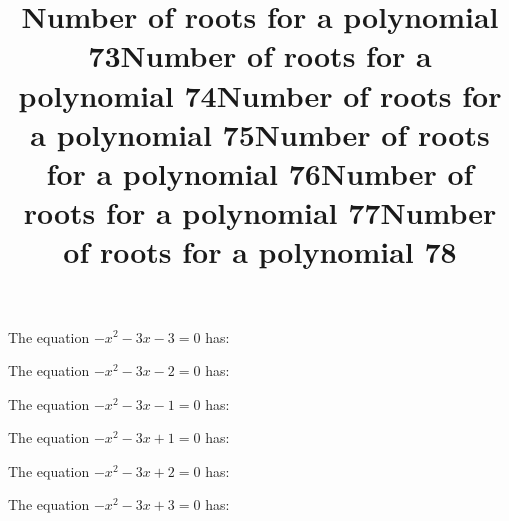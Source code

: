 \documentclass{article}
\begin{document}
\begin{category}
\begin{question}[multichoice]


\end{question}
\begin{question}[multichoice]
\title{Number of roots for a polynomial 73}
The equation $- x^{2} - 3 x - 3=0$ has:



\end{question}
\begin{question}[multichoice]
\title{Number of roots for a polynomial 74}
The equation $- x^{2} - 3 x - 2=0$ has:



\end{question}
\begin{question}[multichoice]
\title{Number of roots for a polynomial 75}
The equation $- x^{2} - 3 x - 1=0$ has:



\end{question}
\begin{question}[multichoice]
\title{Number of roots for a polynomial 76}
The equation $- x^{2} - 3 x + 1=0$ has:



\end{question}
\begin{question}[multichoice]
\title{Number of roots for a polynomial 77}
The equation $- x^{2} - 3 x + 2=0$ has:



\end{question}
\begin{question}[multichoice]
\title{Number of roots for a polynomial 78}
The equation $- x^{2} - 3 x + 3=0$ has:




\end{question}
\end{category}
\end{document}
